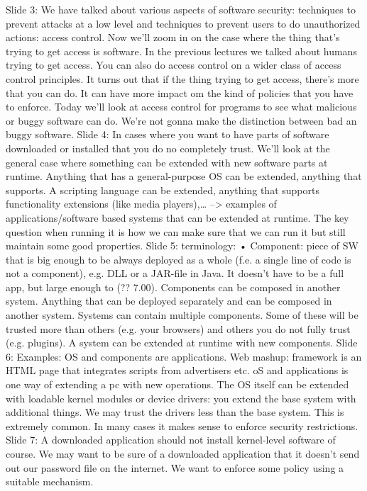 \documentclass[10pt,a4paper]{report}
\begin{document}
Slide 3: We have talked about various aspects of software security: techniques to prevent attacks at a low level  and techniques to prevent users to do unauthorized actions: access control.
Now we'll zoom in on the case where the thing that's trying to get access is software. In the previous lectures we talked about humans trying to get access. You can also do access control on a wider class of access control principles. It turns out that if the thing trying to get access, there's more that you can do. It can have more impact om the kind of policies that you have to enforce.
Today we'll look at access control for programs to see what malicious or buggy software can do. We're not gonna make the distinction between bad an buggy software.
Slide 4: In cases where you want to have parts of software downloaded or installed that you do no completely trust. We'll look at the general case where something can be extended with new software parts at runtime. Anything that has a general-purpose OS can be extended, anything that supports. A scripting language can be extended, anything that supports functionality extensions (like media players),… --> examples of applications/software based systems that can be extended at runtime.
The key question  when running it is how we can make sure that we can run it but still maintain some good properties.
Slide 5: terminology:
	• Component: piece of SW that is big enough to be always deployed as a whole (f.e. a single line of code is not a component), e.g. DLL or a JAR-file in Java. It doesn't have to be a full app, but large enough to (?? 7.00). Components can be composed in another system. Anything that can be deployed separately and can be composed in another system. Systems can contain multiple components. Some of these will be trusted more than others (e.g. your browsers) and others you do not fully trust (e.g. plugins). A system can be extended at runtime with new components. 
Slide 6: Examples: OS and components are applications. Web mashup: framework is an HTML page that integrates scripts from advertisers etc. 
oS and applications is one way of extending a pc with new operations.
The OS itself can be extended with loadable kernel modules or device drivers: you extend the base system with additional things. We may trust the drivers less than the base system.
This is extremely common. In many cases it makes sense to enforce security restrictions.
Slide 7: A downloaded application should not install kernel-level software of course. We may want to be sure of a downloaded application that it doesn't send out our password file on the internet. We want to enforce some policy using a suitable mechanism.
\end{document}
